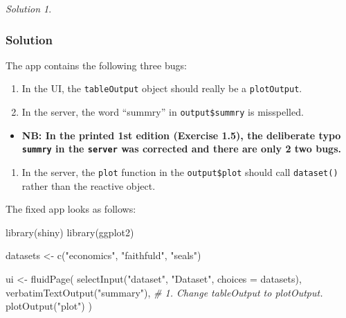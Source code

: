 \documentclass[
]{book}
\newenvironment{Shaded}{\begin{snugshade}}{\end{snugshade}}
\newcommand{\AttributeTok}[1]{\textcolor[rgb]{0.77,0.63,0.00}{#1}}
\newcommand{\CommentTok}[1]{\textcolor[rgb]{0.56,0.35,0.01}{\textit{#1}}}
\newcommand{\FunctionTok}[1]{\textcolor[rgb]{0.00,0.00,0.00}{#1}}
\newcommand{\NormalTok}[1]{#1}
\newcommand{\OtherTok}[1]{\textcolor[rgb]{0.56,0.35,0.01}{#1}}
\newcommand{\StringTok}[1]{\textcolor[rgb]{0.31,0.60,0.02}{#1}}
\providecommand{\tightlist}{%
  \setlength{\itemsep}{0pt}\setlength{\parskip}{0pt}}
\theoremstyle{definition}
\theoremstyle{definition}
\theoremstyle{definition}
\theoremstyle{definition}
\theoremstyle{remark}
\newtheorem*{solution}{Solution}
\begin{document}
\begin{solution}
\leavevmode

\hypertarget{solution-4}{%
\subsubsection*{Solution}\label{solution-4}}

The app contains the following three bugs:

\begin{enumerate}
\def\labelenumi{\arabic{enumi}.}
\tightlist
\item
  In the UI, the \texttt{tableOutput} object should really be a \texttt{plotOutput}.\\
\item
  In the server, the word ``summry'' in \texttt{output\$summry} is misspelled.
\end{enumerate}

\begin{itemize}
\tightlist
\item
  \textbf{NB: In the printed 1st edition (Exercise 1.5), the deliberate typo \texttt{summry} in the \texttt{server} was corrected and there are only 2 two bugs.}
\end{itemize}

\begin{enumerate}
\def\labelenumi{\arabic{enumi}.}
\setcounter{enumi}{2}
\tightlist
\item
  In the server, the \texttt{plot} function in the \texttt{output\$plot} should call
  \texttt{dataset()} rather than the reactive object.
\end{enumerate}

The fixed app looks as follows:

\begin{Shaded}
\begin{Highlighting}[]
\FunctionTok{library}\NormalTok{(shiny)}
\FunctionTok{library}\NormalTok{(ggplot2)}

\NormalTok{datasets }\OtherTok{\textless{}{-}} \FunctionTok{c}\NormalTok{(}\StringTok{"economics"}\NormalTok{, }\StringTok{"faithfuld"}\NormalTok{, }\StringTok{"seals"}\NormalTok{)}

\NormalTok{ui }\OtherTok{\textless{}{-}} \FunctionTok{fluidPage}\NormalTok{(}
  \FunctionTok{selectInput}\NormalTok{(}\StringTok{"dataset"}\NormalTok{, }\StringTok{"Dataset"}\NormalTok{, }\AttributeTok{choices =}\NormalTok{ datasets),}
  \FunctionTok{verbatimTextOutput}\NormalTok{(}\StringTok{"summary"}\NormalTok{),}
  \CommentTok{\# 1. Change tableOutput to plotOutput.}
  \FunctionTok{plotOutput}\NormalTok{(}\StringTok{"plot"}\NormalTok{)}
\NormalTok{)}


\end{Highlighting}
\end{Shaded}
\end{solution}
\end{document}
